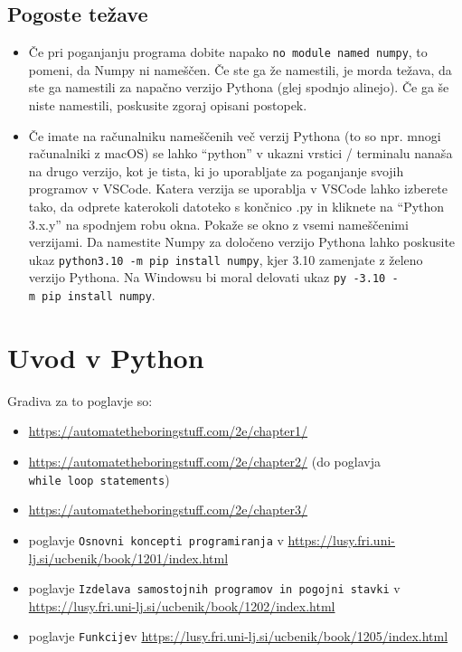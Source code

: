 \documentclass[
]{report}
\providecommand{\tightlist}{%
  \setlength{\itemsep}{0pt}\setlength{\parskip}{0pt}}
\begin{document}
\hypertarget{pogoste-teux17eave}{%
\section{Pogoste težave}\label{pogoste-teux17eave}}

\begin{itemize}
\item
  Če pri poganjanju programa dobite napako \texttt{no\ module\ named\ numpy}, to pomeni, da Numpy ni nameščen. Če ste ga že namestili, je morda težava, da ste ga namestili za napačno verzijo Pythona (glej spodnjo alinejo). Če ga še niste namestili, poskusite zgoraj opisani postopek.
\item
  Če imate na računalniku nameščenih več verzij Pythona (to so npr. mnogi računalniki z macOS) se lahko ``python'' v ukazni vrstici / terminalu nanaša na drugo verzijo, kot je tista, ki jo uporabljate za poganjanje svojih programov v VSCode. Katera verzija se uporablja v VSCode lahko izberete tako, da odprete katerokoli datoteko s končnico .py in kliknete na ``Python 3.x.y'' na spodnjem robu okna. Pokaže se okno z vsemi nameščenimi verzijami. Da namestite Numpy za določeno verzijo Pythona lahko poskusite ukaz \texttt{python3.10\ -m\ pip\ install\ numpy}, kjer 3.10 zamenjate z želeno verzijo Pythona. Na Windowsu bi moral delovati ukaz \texttt{py\ -3.10\ -m\ pip\ install\ numpy}.
\end{itemize}

\hypertarget{uvod-v-python}{%
\chapter{Uvod v Python}\label{uvod-v-python}}

Gradiva za to poglavje so:

\begin{itemize}
\tightlist
\item
  \url{https://automatetheboringstuff.com/2e/chapter1/}
\item
  \url{https://automatetheboringstuff.com/2e/chapter2/} (do poglavja \texttt{while\ loop\ statements})
\item
  \url{https://automatetheboringstuff.com/2e/chapter3/}
\item
  poglavje \texttt{Osnovni\ koncepti\ programiranja} v \url{https://lusy.fri.uni-lj.si/ucbenik/book/1201/index.html}
\item
  poglavje \texttt{Izdelava\ samostojnih\ programov\ in\ pogojni\ stavki} v \url{https://lusy.fri.uni-lj.si/ucbenik/book/1202/index.html}
\item
  poglavje \texttt{Funkcije}v \url{https://lusy.fri.uni-lj.si/ucbenik/book/1205/index.html}
\end{itemize}
\end{document}
